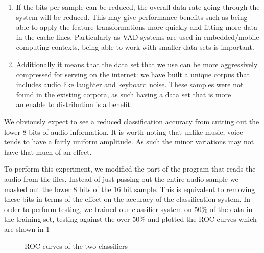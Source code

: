 \documentclass[ %
                    author={Sam Phippen},
                supervisor={Dr. Rafal Bogacz},
                     title={Real time voice activity detectors in noisy personal computing environments},
                  subtitle={},
                    degree={MEng},
                      year={2012} ]{thesis}
\begin{document}
\begin{enumerate}

    \item If the bits per sample can be reduced, the overall data rate going
        through the system will be reduced. This may give performance benefits
        such as being able to apply the feature transformations more quickly
        and fitting more data in the cache lines. Particularly as VAD systems
        are used in embedded/mobile computing contexts, being able to work with
        smaller data sets is important.

    \item Additionally it means that the data set that we use can be more
        aggressively compressed for serving on the internet: we have built a
        unique corpus that includes audio like laughter and keyboard noise.
        These samples were not found in the existing corpora, as such having
        a data set that is more amenable to distribution is a benefit.

\end{enumerate}

We obviously expect to see a reduced classification accuracy from cutting out
the lower 8 bits of audio information. It is worth noting that unlike music,
voice tends to have a fairly uniform amplitude. As such the minor variations
may not have that much of an effect.

To perform this experiment, we modified the part of the program that reads the
audio from the files. Instead of just passing out the entire audio sample we
masked out the lower 8 bits of the 16 bit sample. This is equivalent to
removing these bits in terms of the effect on the accuracy of the
classification system. In order to perform testing, we trained our classifier
system on 50\% of the data in the training set, testing against the over 50\%
and plotted the ROC curves which are shown in \ref{fig:roc-bitcrush}

\begin{figure}
    \caption{ROC curves of the two classifiers}
    \label{fig:roc-bitcrush}
\end{figure}
\end{document}
